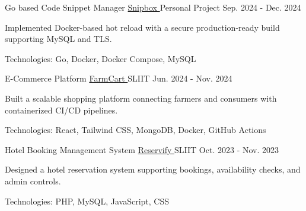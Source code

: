 
\begin{cventries}


  \cventry
    {Go based Code Snippet Manager}
    {\href{https://github.com/nmdra/snipbox}{Snipbox \faGithub}}
    {Personal Project}
    {Sep. 2024 - Dec. 2024}
    {
      \begin{cvitems}
        \item {Implemented Docker-based hot reload with a secure production-ready build supporting MySQL and TLS.}
        \item {Technologies: Go, Docker, Docker Compose, MySQL}
      \end{cvitems}
    }

  \cventry
    {E-Commerce Platform}
    {\href{https://github.com/nmdra/FarmCart}{FarmCart \faGithub}}
    {SLIIT}
    {Jun. 2024 - Nov. 2024}
    {
      \begin{cvitems}
        \item {Built a scalable shopping platform connecting farmers and consumers with containerized CI/CD pipelines.}
        \item {Technologies: React, Tailwind CSS, MongoDB, Docker, GitHub Actions}
      \end{cvitems}
    }

  \cventry
    {Hotel Booking Management System}
    {\href{https://github.com/nmdra/Reservify}{Reservify \faGithub}}
    {SLIIT}
    {Oct. 2023 - Nov. 2023}
    {
      \begin{cvitems}
        \item {Designed a hotel reservation system supporting bookings, availability checks, and admin controls.}
        \item {Technologies: PHP, MySQL, JavaScript, CSS}
      \end{cvitems}
    }


\end{cventries}

